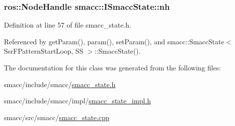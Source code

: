 \subsubsection[{\texorpdfstring{nh}{nh}}]{\setlength{\rightskip}{0pt plus 5cm}ros\+::\+Node\+Handle smacc\+::\+I\+Smacc\+State\+::nh}\hypertarget{classsmacc_1_1ISmaccState_a13fe6e6abfdb87996402189d44b78494}{}\label{classsmacc_1_1ISmaccState_a13fe6e6abfdb87996402189d44b78494}


Definition at line 57 of file smacc\+\_\+state.\+h.



Referenced by get\+Param(), param(), set\+Param(), and smacc\+::\+Smacc\+State$<$ Ssr\+F\+Pattern\+Start\+Loop, S\+S $>$\+::\+Smacc\+State().



The documentation for this class was generated from the following files\+:\begin{DoxyCompactItemize}
\item 
smacc/include/smacc/\hyperlink{smacc__state_8h}{smacc\+\_\+state.\+h}\item 
smacc/include/smacc/impl/\hyperlink{smacc__state__impl_8h}{smacc\+\_\+state\+\_\+impl.\+h}\item 
smacc/src/smacc/\hyperlink{smacc__state_8cpp}{smacc\+\_\+state.\+cpp}\end{DoxyCompactItemize}
